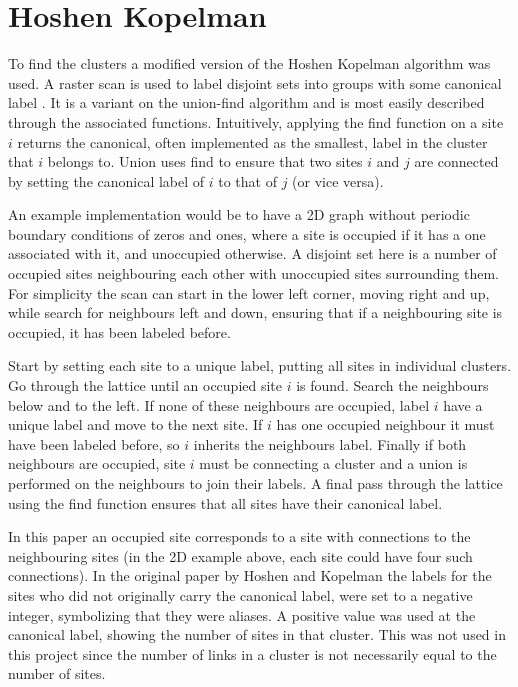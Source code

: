 \section{Hoshen Kopelman}
\label{sec:HoshenKopelman}

To find the clusters a modified version of the Hoshen Kopelman algorithm was used. A raster scan is used to label disjoint sets into groups with some canonical label \cite{Hoshen:HKAlgo}. It is a variant on the union-find algorithm and is most easily described through the associated functions. Intuitively, applying the find function on a site $i$ returns the canonical, often implemented as the smallest, label in the cluster that $i$ belongs to. Union uses find to ensure that two sites $i$ and $j$ are connected by setting the canonical label of $i$ to that of $j$ (or vice versa). 

An example implementation would be to have a 2D graph without periodic boundary conditions of zeros and ones, where a site is occupied if it has a one associated with it, and unoccupied otherwise. A disjoint set here is a number of occupied sites neighbouring each other with unoccupied sites surrounding them. For simplicity the scan can start in the lower left corner, moving right and up, while search for neighbours left and down, ensuring that if a neighbouring site is occupied, it has been labeled before. 

Start by setting each site to a unique label, putting all sites in individual clusters. Go through the lattice until an occupied site $i$ is found. Search the neighbours below and to the left. If none of these neighbours are occupied, label $i$ have a unique label and move to the next site. If $i$ has one occupied neighbour it must have been labeled before, so $i$ inherits the neighbours label. Finally if both neighbours are occupied, site $i$ must be connecting a cluster and a union is performed on the neighbours to join their labels. A final pass through the lattice using the find function ensures that all sites have their canonical label.

In this paper an occupied site corresponds to a site with connections to the neighbouring sites (in the 2D example above, each site could have four such connections). In the original paper by Hoshen and Kopelman the labels for the sites who did not originally carry the canonical label, were set to a negative integer, symbolizing that they were aliases. A positive value was used at the canonical label, showing the number of sites in that cluster. This was not used in this project since the number of links in a cluster is not necessarily equal to the number of sites.


